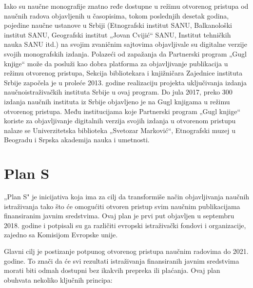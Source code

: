 \documentclass{article}
\begin{document}
Iako su naučne monografije znatno ređe dostupne u režimu otvorenog pristupa od naučnih radova objavljenih u časopisima, tokom poslednjih desetak godina, pojedine naučne ustanove u Srbiji (Etnografski institut SANU, Balkanološki institut SANU, Geografski institut „Jovan Cvijić“ SANU, Institut tehničkih nauka SANU itd.) na svojim zvaničnim sajtovima objavljivale su digitalne verzije svojih monografskih izdanja. Polazeći od zapažanja da Partnerski program „Gugl knjige“ može da posluži kao dobra platforma za objavljivanje publikacija u režimu otvorenog pristupa, Sekcija bibliotekara i knjižničara Zajednice instituta Srbije započela je u proleće 2013. godine realizaciju projekta uključivanja izdanja naučnoistraživačkih instituta Srbije u ovaj program. Do jula 2017, preko 300 izdanja naučnih instituta iz Srbije objavljeno je na Gugl knjigama u režimu otvorenog pristupa. Među institucijama koje Partnerski program „Gugl knjige“ koriste za objavljivanje digitalnih verzija svojih izdanja u otvorenom pristupu nalaze se Univerzitetska biblioteka „Svetozar Marković“, Etnografski muzej u Beogradu i Srpska akademija nauka i umetnosti.


\section{Plan S}

„Plan S" je inicijativa koja ima za cilj da transformiše način objavljivanja naučnih istraživanja tako što će omogućiti otvoren pristup svim naučnim publikacijama finansiranim javnim sredstvima. Ovaj plan je prvi put objavljen u septembru 2018. godine i potpisali su ga različiti evropski istraživački fondovi i organizacije, zajedno sa Komisijom Evropske unije.

Glavni cilj je postizanje potpunog otvorenog pristupa naučnim radovima do 2021. godine. To znači da će svi rezultati istraživanja finansiranih javnim sredstvima morati biti odmah dostupni bez ikakvih prepreka ili plaćanja. Ovaj plan obuhvata nekoliko ključnih principa:
\end{document}
